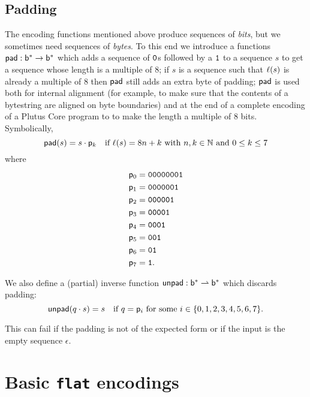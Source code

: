 \subsection{Padding}
The encoding functions mentioned above produce sequences of \textit{bits}, but
we sometimes need sequences of \textit{bytes}.  To this end we introduce a
functions $\mathsf{pad}: \mathsf{b}^* \rightarrow \mathsf{b}^*$ which adds a sequence of $\mathtt{0}$s
followed by a $\mathtt{1}$ to a sequence $s$ to get a sequence whose length is a
multiple of 8; if $s$ is a sequence such that $\operatorname{\ell}(s)$ is already a multiple of 8
then $\mathsf{pad}$ still adds an extra byte of padding; $\mathsf{pad}$ is used both for
internal alignment (for example, to make sure that the contents of a bytestring
are aligned on byte boundaries) and at the end of a complete encoding of a
Plutus Core program to to make the length a multiple of 8 bits.
Symbolically,
$$
\mathsf{pad}(s)  = s \cdot \mathsf{p}_{k} \quad \text{if $\operatorname{\ell}(s) = 8n+k$ with $n,k \in \mathbb{N}$ and $0 \leq k \leq 7$}
$$
where
\begin{align*}
 \mathsf{p}_{0} &= \mathtt{00000001} \\
 \mathsf{p}_{1} &= \mathtt{0000001}  \\
 \mathsf{p}_{2} &= \mathtt{000001}   \\
 \mathsf{p}_{3} &= \mathtt{00001}    \\
 \mathsf{p}_{4} &= \mathtt{0001}     \\
 \mathsf{p}_{5} &= \mathtt{001}      \\
 \mathsf{p}_{6} &= \mathtt{01}       \\
 \mathsf{p}_{7} &= \mathtt{1}.
 \end{align*}

\noindent We also define a (partial) inverse function $\mathsf{unpad}: \mathsf{b}^* \rightharpoonup
\mathsf{b}^*$ which discards padding:
$$
  \mathsf{unpad}(q \cdot s) = s \quad \text{if $q = \mathsf{p}_{i}$ for some $i \in \{0,1,2,3,4,5,6,7\} $}.
$$

\noindent This can fail if the padding is not of the expected form or if the input is
the empty sequence $\epsilon$.

\section{Basic \texttt{flat} encodings}
\label{sec:basic-flat-encodings}
